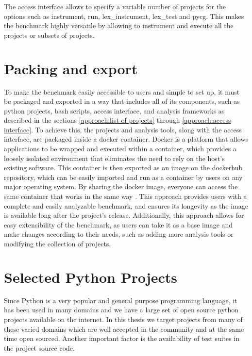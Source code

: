 The access interface allows to specify a variable number of projects for the options such as instrument, run, lex\_instrument, lex\_test and pycg. This makes the benchmark highly versatile by allowing to instrument and execute all the projects or subsets of projects.

\section{Packing and export}
\label{approach: packing and exporting}
To make the benchmark easily accessible to users and simple to set up, it must be packaged and exported in a way that includes all of its components, such as python projects, bash scripts, access interface, and analysis frameworks as described in the sections \ref{approach:list of projects} through \ref{approach:access interface}. To achieve this, the projects and analysis tools, along with the access interface, are packaged inside a docker container. Docker is a platform that allows applications to be wrapped and executed within a container, which provides a loosely isolated environment that eliminates the need to rely on the host's existing software. This container is then exported as an image on the dockerhub repository, which can be easily imported and run as a container by users on any major operating system. By sharing the docker image, everyone can access the same container that works in the same way \cite{Docker_2022}. This approach provides users with a complete and easily analyzable benchmark, and ensures its longevity as the image is available long after the project's release. Additionally, this approach allows for easy extensibility of the benchmark, as users can take it as a base image and make changes according to their needs, such as adding more analysis tools or modifying the collection of projects.

\section{Selected Python Projects}
\label{approach:selection of projects}
Since Python is a very popular and general purpose programming language, it has been used in many domains and we have a large set of open source python projects available on the internet. In this thesis we target projects from many of these varied domains which are well accepted in the community and at the same time open sourced. Another important factor is the availability of test suites in the project source code. 

